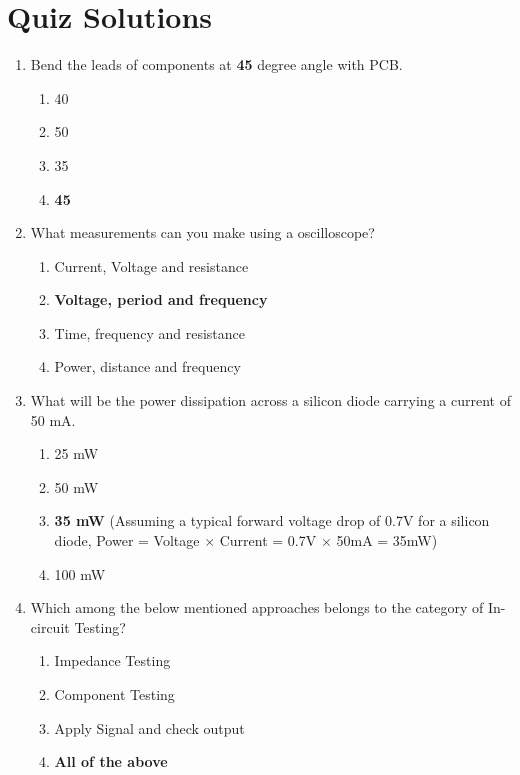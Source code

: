 \documentclass[a4paper,12pt]{article}
\begin{document}
	

		
		\section*{Quiz Solutions}
		
		\begin{enumerate}
			\item Bend the leads of components at \textbf{45} degree angle with PCB.
			\begin{enumerate}
				\item 40
				\item 50
				\item 35
				\item \textbf{45}
			\end{enumerate}
			
			\item What measurements can you make using a oscilloscope?
			\begin{enumerate}
				\item Current, Voltage and resistance
				\item \textbf{Voltage, period and frequency}
				\item Time, frequency and resistance
				\item Power, distance and frequency
			\end{enumerate}
			
			\item What will be the power dissipation across a silicon diode carrying a current of 50 mA.
			\begin{enumerate}
				\item 25 mW
				\item 50 mW
				\item \textbf{35 mW} (Assuming a typical forward voltage drop of 0.7V for a silicon diode, Power = Voltage $\times$ Current = 0.7V $\times$ 50mA = 35mW)
				\item 100 mW
			\end{enumerate}
			
			\item Which among the below mentioned approaches belongs to the category of In-circuit Testing?
			\begin{enumerate}
				\item Impedance Testing
				\item Component Testing
				\item Apply Signal and check output
				\item \textbf{All of the above}
			\end{enumerate}
			

\end{enumerate}
\end{document}
